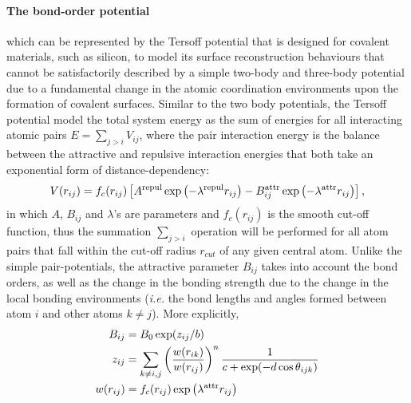 \paragraph{The bond-order potential} which can be represented by the Tersoff potential\cite{tersoff1986new} that is designed for covalent materials, such as silicon, to model its surface reconstruction behaviours that cannot be satisfactorily described by a simple two-body and three-body potential due to a fundamental change in the atomic coordination environments upon the formation of covalent surfaces. Similar to the two body potentials, the Tersoff potential model the total system energy as the sum of energies for all interacting atomic pairs $E=\sum_{j>i}V_{ij}$, where the pair interaction energy is the balance between the attractive and repulsive interaction energies that both take an exponential form of distance-dependency\cite{abell1985empirical}:
\begin{equation}\label{eq:tersoff}
V(r_{ij})=f_c(r_{ij})\left[A^{\mbox{\scriptsize{repul}}}\exp\left(-\lambda^{\mbox{\scriptsize{repul}}}r_{ij}\right)
-B^{\mbox{\scriptsize{attr}}}_{ij}\exp\left(-\lambda^{\mbox{\scriptsize{attr}}}r_{ij}\right)\right],
\end{equation}
in which $A$, $B_{ij}$ and $\lambda$'s are parameters and $f_c(r_{ij})$ is the smooth cut-off function, thus the summation $\sum_{j>i}$ operation will be performed for all atom pairs that fall within the cut-off radius $r_{cut}$ of any given central atom. Unlike the simple pair-potentials, the attractive parameter $B_{ij}$ takes into account the bond orders, as well as the change in the bonding strength due to the change in the local bonding environments (\emph{i.e.} the bond lengths and angles formed between atom $i$ and other atoms $k\neq j$). More explicitly, 
\begin{subequations}
    \begin{align}
    B_{ij}&=B_{0}\exp(z_{ij}/b)\label{eq:tersoff_b}\\
        z_{ij}&=\sum_{k\neq i,j}\left(\frac{w(r_{ik})}{w(r_{ij})}\right)^n \frac{1}{c+\exp(-d\cos\theta_{ijk})}\label{eq:tersoff_z}\\
        w(r_{ij})&=f_c(r_{ij})\exp\left(\lambda^{\mbox{\scriptsize{attr}}}r_{ij}\right)\label{eq:tersoff_w}
    \end{align}
\end{subequations}

